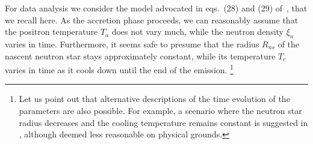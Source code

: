 \documentclass[a4paper,11pt]{article}
\newcommand*{\red}{\textcolor{red}}
\begin{document}

For data analysis  we consider the model advocated in eqs.~(28) and (29) of~\cite{sym13101851},  that we recall here. As the accretion phase proceeds,  we can reasonably assume that the positron temperature $T_a$ does not vary much, while the neutron density $\xi_{n}$ varies in time.
Furthermore, it seems safe to presume that  the radius $R_{ns}$ of the nascent neutron star  stays approximately constant, while its temperature $T_c$ varies in time as it cools down until the end of the emission. \footnote{Let us point out that alternative descriptions of the time evolution of the parameters are also possible. For example, 
  a scenario where the neutron star radius decreases and the cooling temperature remains constant is suggested in \cite{sym13101851}, although deemed less reasonable on  physical grounds.}
\end{document}
